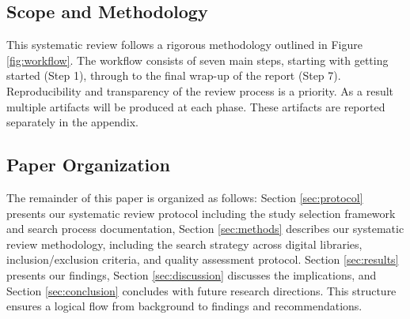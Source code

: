 \subsection{Scope and Methodology}
This systematic review follows a rigorous methodology outlined in Figure \ref{fig:workflow}. The
workflow consists of seven main steps, starting with getting started (Step 1), through to the final
wrap-up of the report (Step 7). Reproducibility and transparency of the review process is a
priority. As a result multiple artifacts will be produced at each phase. These artifacts are
reported separately in the appendix.



\subsection{Paper Organization}
The remainder of this paper is organized as follows: Section \ref{sec:protocol} presents our
systematic review protocol including the study selection framework and search process
documentation, Section \ref{sec:methods} describes our systematic review methodology, including the
search strategy across digital libraries, inclusion/exclusion criteria, and quality assessment
protocol. Section \ref{sec:results} presents our findings, Section \ref{sec:discussion} discusses
the implications, and Section \ref{sec:conclusion} concludes with future research directions. This
structure ensures a logical flow from background to findings and recommendations.
